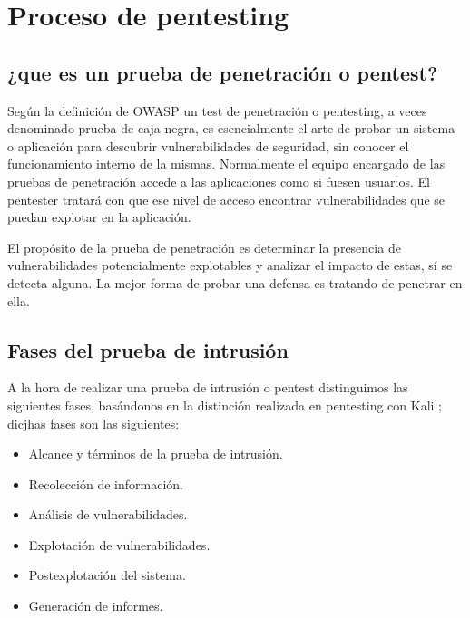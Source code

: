 
\section{Proceso de pentesting} 

\subsection{¿que es un prueba de penetración o pentest?}
Según la definición de OWASP \cite{web1} un test de penetración o pentesting, a veces denominado 
prueba de caja negra, es esencialmente el arte de probar
un sistema o aplicación para descubrir vulnerabilidades de seguridad, sin conocer el funcionamiento interno de la mismas. Normalmente el equipo 
encargado de las pruebas de penetración accede a las aplicaciones como si fuesen usuarios. El pentester tratará con 
que ese nivel de acceso encontrar vulnerabilidades que se puedan explotar en la aplicación.

El propósito de la prueba de penetración es determinar la presencia 
de vulnerabilidades potencialmente explotables y analizar el impacto de estas,
sí se detecta alguna. La mejor forma de probar una defensa es tratando de penetrar en ella.
\newpage

\subsection{Fases del prueba de intrusión}
A la hora de realizar una prueba de intrusión o pentest distinguimos las siguientes fases, basándonos en 
la distinción realizada en pentesting con Kali  \cite{ref1};  dicjhas fases son las siguientes:
\begin{itemize}
    \item Alcance y términos de la prueba de intrusión.
    \item Recolección de información.
    \item Análisis de vulnerabilidades.
    \item Explotación de vulnerabilidades.
    \item Postexplotación del sistema.
    \item Generación de informes.
\end{itemize}
